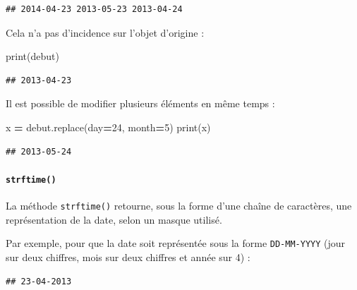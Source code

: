 \documentclass[12pt,]{book}
\newenvironment{Shaded}{\begin{snugshade}}{\end{snugshade}}
\newcommand{\DecValTok}[1]{\textcolor[rgb]{0.00,0.00,0.81}{#1}}
\newcommand{\SpecialCharTok}[1]{\textcolor[rgb]{0.00,0.00,0.00}{#1}}
\newcommand{\StringTok}[1]{\textcolor[rgb]{0.31,0.60,0.02}{#1}}
\newcommand{\OperatorTok}[1]{\textcolor[rgb]{0.81,0.36,0.00}{\textbf{#1}}}
\newcommand{\BuiltInTok}[1]{#1}
\newcommand{\NormalTok}[1]{#1}
\let\oldparagraph\paragraph
\renewcommand{\paragraph}[1]{\oldparagraph{#1}\mbox{}}
\numberwithin{equation}{section}
\numberwithin{countremarque}{section}
\begin{document}
\begin{lstlisting}
## 2014-04-23 2013-05-23 2013-04-24
\end{lstlisting}

Cela n'a pas d'incidence sur l'objet d'origine :

\begin{Shaded}
\begin{Highlighting}[]
\BuiltInTok{print}\NormalTok{(debut)}
\end{Highlighting}
\end{Shaded}

\begin{lstlisting}
## 2013-04-23
\end{lstlisting}

Il est possible de modifier plusieurs éléments en même temps :

\begin{Shaded}
\begin{Highlighting}[]
\NormalTok{x }\OperatorTok{=}\NormalTok{ debut.replace(day}\OperatorTok{=}\DecValTok{24}\NormalTok{, month}\OperatorTok{=}\DecValTok{5}\NormalTok{)}
\BuiltInTok{print}\NormalTok{(x)}
\end{Highlighting}
\end{Shaded}

\begin{lstlisting}
## 2013-05-24
\end{lstlisting}

\paragraph{\texorpdfstring{\texttt{strftime()}}{strftime()}}\label{strftime}

La méthode \texttt{strftime()} retourne, sous la forme d'une chaîne de
caractères, une représentation de la date, selon un masque utilisé.

Par exemple, pour que la date soit représentée sous la forme
\texttt{DD-MM-YYYY} (jour sur deux chiffres, mois sur deux chiffres et
année sur 4) :

\begin{Shaded}
\end{Shaded}

\begin{lstlisting}
## 23-04-2013
\end{lstlisting}
\end{document}
